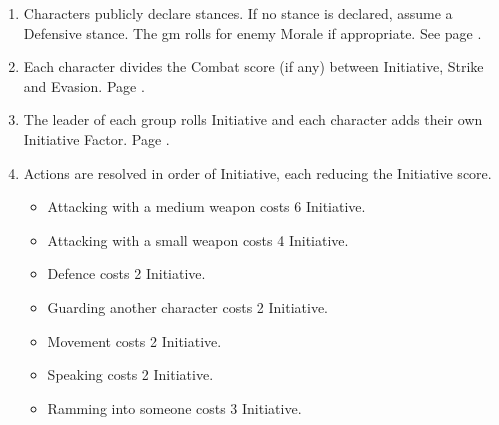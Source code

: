 \begin{multicols}{2}

\begin{enumerate}
	\item{Characters publicly declare stances. If no stance is declared, assume a Defensive stance. The \gls{gm} rolls for enemy Morale if appropriate.
	See page \pageref{stances}.}
	\item{Each character divides the Combat score (if any) between Initiative, Strike and Evasion. Page \pageref{combat_factor}.}
	\item{The leader of each group rolls Initiative and each character adds their own Initiative Factor. Page \pageref{initiative}.}
	\item{Actions are resolved in order of Initiative, each reducing the Initiative score.}
	\begin{itemize}
		\item{Attacking with a medium weapon costs 6 Initiative.}
		\item{Attacking with a small weapon costs 4 Initiative.}
		\item{Defence costs 2 Initiative.}
		\item{Guarding another character costs 2 Initiative.}
		\item{Movement costs 2 Initiative.}
		\item{Speaking costs 2 Initiative.}
		\item{Ramming into someone costs 3 Initiative.}
	\end{itemize}
\end{enumerate}

\end{multicols}

\stopcontents[Combat]

